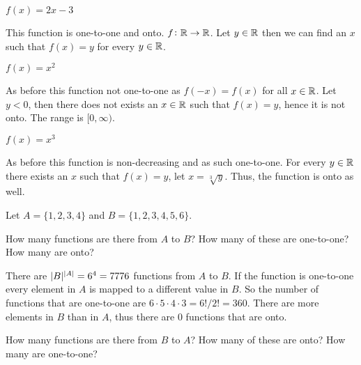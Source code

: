 \documentclass[a4paper, english, 12pt]{article} %
\begin{document}
\begin{subproblem}[2]
  $f(x) = 2x - 3$
\end{subproblem}

\begin{answer}
  This function is one-to-one and onto. $f \colon \mathbb{R} \to \mathbb{R}$. Let $y \in \mathbb{R}$
  then we can find an $x$ such that $f(x) = y$ for every $y \in \mathbb{R}$.
\end{answer}

\begin{subproblem}[4]
  $f(x) = x^2$
\end{subproblem}

\begin{answer}
  As before this function not one-to-one as $f(-x)=f(x)$ for all $x \in \mathbb{R}$.
  Let $y<0$, then there does not exists an $x \in \mathbb{R}$ such that $f(x) = y$,
  hence it is not onto. The range is $[0,\infty)$.
\end{answer}

\begin{subproblem}[6]
  $f(x) = x^3$
\end{subproblem}

\begin{answer}
  As before this function is non-decreasing and as such one-to-one. For every $y
  \in \mathbb{R}$ there exists an $x$ such that $f(x) = y$, let $x = \sqrt[3]{y}$. Thus,
  the function is onto as well.
\end{answer}

\begin{problem}
  Let $A = \{1, 2, 3, 4\}$ and $B = \{1, 2, 3, 4, 5, 6\}$.
\end{problem}

\begin{subproblem}
  How many functions are there from $A$ to $B$? How many of these are
  one-to-one? How many are onto?
\end{subproblem}

\begin{answer}
  There are $\lvert B\rvert^{\lvert A\rvert} = 6^4 = 7776$ functions from $A$ to $B$. If the
  function is one-to-one every element in $A$ is mapped to a different value in
  $B$. So the number of functions that are one-to-one are $6 \cdot 5 \cdot 4
  \cdot 3 = 6!/2! = 360$. There are more elements in $B$ than in $A$, thus there
  are $0$ functions that are onto.
\end{answer}

\begin{subproblem}
  How many functions are there from $B$ to $A$? How many of these are
  onto? How many are one-to-one?
\end{subproblem}
\end{document}
